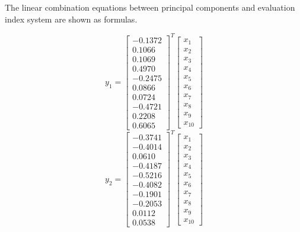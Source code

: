 \documentclass{mcmthesis}
\begin{document}
\begin{enumerate}
        The linear combination equations between principal components and evaluation index system are shown as formulas.

          \begin{table}[!hbpt]
               \centering
               $${ y }_{ 1 }={ \begin{bmatrix} -0.1372 \\ 0.1066 \\ 0.1069 \\ 0.4970 \\ -0.2475 \\ 0.0866 \\ 0.0724 \\ -0.4721 \\ 0.2208 \\ 0.6065 \end{bmatrix} }^{ T }\begin{bmatrix} x_{ 1 } \\ x_{ 2 } \\ x_{ 3 } \\ x_{ 4 } \\ x_{ 5 } \\ x_{ 6 } \\ x_{ 7 } \\ x_{ 8 } \\ x_{ 9 } \\ x_{ 10 } \end{bmatrix}$$
              $${ y }_{ 2 }={ \begin{bmatrix} -0.3741 \\ -0.4014 \\ 0.0610 \\ -0.4187 \\ -0.5216 \\ -0.4082 \\ -0.1901 \\ -0.2053 \\ 0.0112 \\ 0.0538 \end{bmatrix} }^{ T }\begin{bmatrix} x_{ 1 } \\ x_{ 2 } \\ x_{ 3 } \\ x_{ 4 } \\ x_{ 5 } \\ x_{ 6 } \\ x_{ 7 } \\ x_{ 8 } \\ x_{ 9 } \\ x_{ 10 } \end{bmatrix}$$

\end{table}
\end{enumerate}
\end{document}
